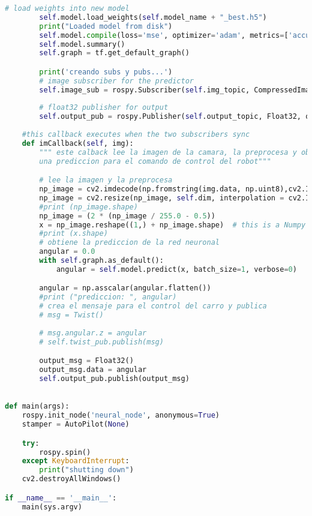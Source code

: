 \begin{lstlisting}[title={neural\_node.py},language=Python]
        # load weights into new model
        self.model.load_weights(self.model_name + "_best.h5")
        print("Loaded model from disk") 
        self.model.compile(loss='mse', optimizer='adam', metrics=['accuracy'])
        self.model.summary()
        self.graph = tf.get_default_graph()

        print('creando subs y pubs...')
        # image subscriber for the predictor
        self.image_sub = rospy.Subscriber(self.img_topic, CompressedImage, self.imCallback, queue_size=1)
        
        # float32 publisher for output 
        self.output_pub = rospy.Publisher(self.output_topic, Float32, queue_size=1)
    
    #this callback executes when the two subscribers sync
    def imCallback(self, img):
        """ este calback lee la imagen de la camara, la preprocesa y obtiene 
        una prediccion para el comando de control del robot"""

        # lee la imagen y la preprocesa
        np_image = cv2.imdecode(np.fromstring(img.data, np.uint8),cv2.IMREAD_COLOR)
        np_image = cv2.resize(np_image, self.dim, interpolation = cv2.INTER_AREA)
        #print (np_image.shape)
        np_image = (2 * (np_image / 255.0 - 0.5))
        x = np_image.reshape((1,) + np_image.shape)  # this is a Numpy array with shape (1, h,w, c)
        #print (x.shape)
        # obtiene la prediccion de la red neuronal
        angular = 0.0
        with self.graph.as_default():
            angular = self.model.predict(x, batch_size=1, verbose=0)

        angular = np.asscalar(angular.flatten())
        #print ("prediccion: ", angular)
        # crea el mensaje para el control del carro y publica 
        # msg = Twist()
        
        # msg.angular.z = angular
        # self.twist_pub.publish(msg)

        output_msg = Float32()
        output_msg.data = angular
        self.output_pub.publish(output_msg)

        
def main(args):
    rospy.init_node('neural_node', anonymous=True)
    stamper = AutoPilot(None)

    try:
        rospy.spin()
    except KeyboardInterrupt:
        print("shutting down")
    cv2.destroyAllWindows()

if __name__ == '__main__':
    main(sys.argv)

\end{lstlisting}

